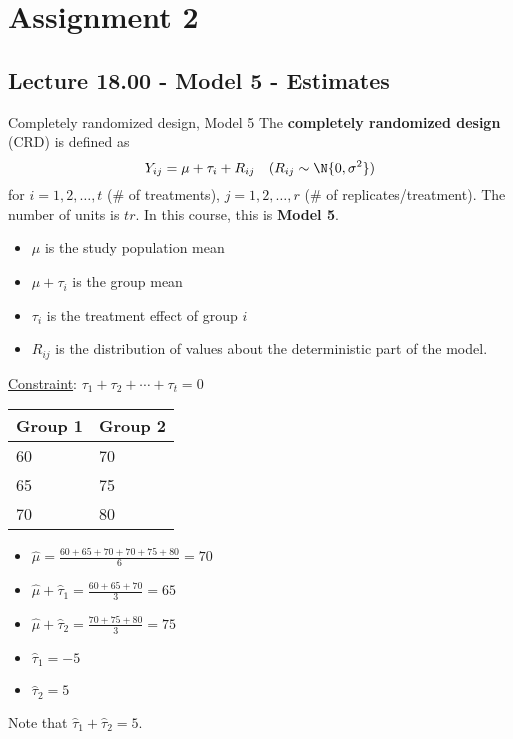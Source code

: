 \chapter{Assignment 2}
\section{Lecture 18.00 - Model 5 - Estimates}
\begin{Definition}{Completely randomized design, Model 5}{}
    The \textbf{completely randomized design} (CRD) is defined as
    \[ Y_{ij}=\mu+\tau_i+R_{ij}\quad(R_{ij}\sim \N{0,\sigma^2}) \]
    for $ i=1,2,\ldots,t $ (\# of treatments),
    $ j=1,2,\ldots,r $ (\# of replicates/treatment).
    The number of units is $ tr $. In this course,
    this is \textbf{Model 5}.
    \begin{itemize}
        \item $ \mu $ is the study population mean
        \item $ \mu+\tau_i $ is the group mean
        \item $ \tau_i $ is the treatment effect of group $ i $
        \item $ R_{ij} $ is the distribution of values about the deterministic
              part of the model.
    \end{itemize}
    \underline{Constraint}: $ \tau_1+\tau_2+\cdots+\tau_t=0 $
\end{Definition}
\begin{Example}{}{}
    \begin{center}
        \begin{tabularx}{0.95\linewidth}{@{}YY@{}}
            Group 1 & Group 2 \\
                  & 70      \\
            65      & 75      \\
            70      & 80      \\
        \end{tabularx}
    \end{center}
    \begin{itemize}
        \item $ \hat{\mu}=\frac{60+65+70+70+75+80}{6} =70 $
        \item $ \hat{\mu}+\hat{\tau}_1=\frac{60+65+70}{3}=65 $
        \item $ \hat{\mu}+\hat{\tau}_2=\frac{70+75+80}{3}=75 $
        \item $ \hat{\tau}_1=-5 $
        \item $ \hat{\tau}_2=5 $
    \end{itemize}
    Note that $ \hat{\tau}_1+\hat{\tau}_2=5 $.
\end{Example}

